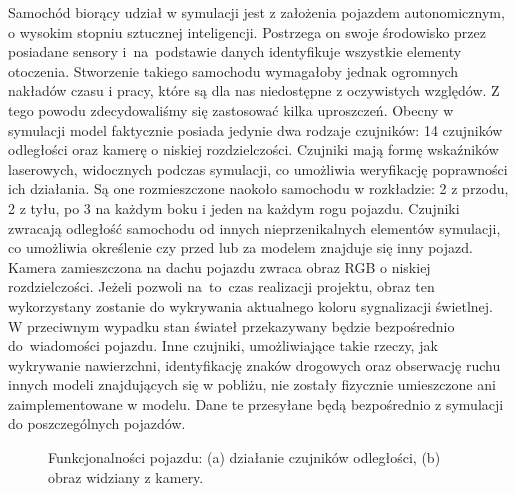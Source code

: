 Samochód biorący udział w symulacji jest z założenia pojazdem autonomicznym, o wysokim stopniu sztucznej inteligencji. Postrzega on swoje środowisko przez posiadane sensory i~na~podstawie danych identyfikuje wszystkie elementy otoczenia. Stworzenie takiego samochodu wymagałoby jednak ogromnych nakładów czasu i pracy, które są dla nas niedostępne z oczywistych względów. Z tego powodu zdecydowaliśmy się zastosować kilka uproszczeń. Obecny w symulacji model faktycznie posiada jedynie dwa rodzaje czujników: 14 czujników odległości oraz kamerę o niskiej rozdzielczości. Czujniki mają formę wskaźników laserowych, widocznych podczas symulacji, co umożliwia weryfikację poprawności ich działania. Są one rozmieszczone naokoło samochodu w rozkładzie: 2 z przodu, 2 z tyłu, po 3 na każdym boku i jeden na każdym rogu pojazdu. Czujniki zwracają odległość samochodu od innych nieprzenikalnych elementów symulacji, co umożliwia określenie czy przed lub za modelem znajduje się inny pojazd. Kamera zamieszczona na dachu pojazdu zwraca obraz RGB o niskiej rozdzielczości. Jeżeli pozwoli na~to~czas realizacji projektu, obraz ten wykorzystany zostanie do wykrywania aktualnego koloru sygnalizacji świetlnej. W przeciwnym wypadku stan świateł przekazywany będzie bezpośrednio do~wiadomości pojazdu. Inne czujniki, umożliwiające takie rzeczy, jak wykrywanie nawierzchni, identyfikację znaków drogowych oraz obserwację ruchu innych modeli znajdujących się w pobliżu, nie zostały fizycznie umieszczone ani zaimplementowane w modelu. Dane te przesyłane będą bezpośrednio z symulacji do poszczególnych pojazdów.

\begin{figure}[!h]
	\centering
	 \hspace{0.2cm}
	\caption{Funkcjonalności pojazdu: (a) działanie czujników odległości, (b) obraz widziany z kamery.}
	\label{fig:model_fun}
\end{figure}
